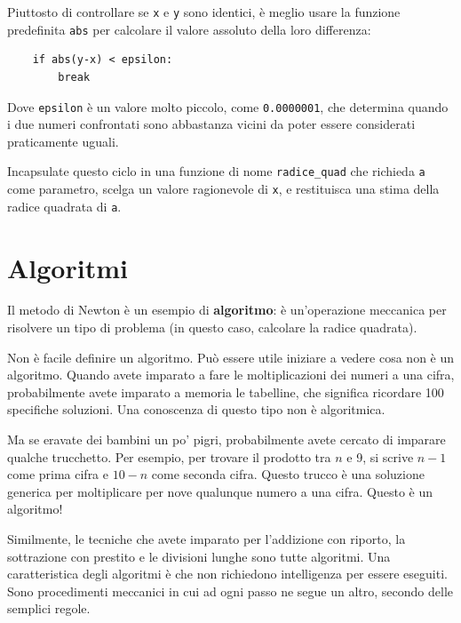 \documentclass[10pt]{book}
\begin{document}
Piuttosto di controllare se {\tt x} e {\tt y} sono identici, è meglio usare la funzione predefinita {\tt abs} per calcolare il valore assoluto della loro differenza:

\begin{verbatim}
    if abs(y-x) < epsilon:
        break
\end{verbatim}
%
Dove \verb"epsilon" è un valore molto piccolo, come {\tt 0.0000001}, che determina quando i due numeri confrontati sono abbastanza vicini da poter essere considerati praticamente uguali.

\vspace{0.2in}
\begin{exercise}

Incapsulate questo ciclo in una funzione di nome \verb"radice_quad"
che richieda {\tt a} come parametro, scelga un valore ragionevole di {\tt x}, e restituisca una stima della radice quadrata di {\tt a}.

\end{exercise}


\section{Algoritmi}

Il metodo di Newton è un esempio di {\bf algoritmo}: è un'operazione meccanica per risolvere un tipo di problema (in questo caso, calcolare la radice quadrata).

Non è facile definire un algoritmo. Può essere utile iniziare a vedere cosa non è un algoritmo. Quando avete imparato a fare le moltiplicazioni dei numeri a una cifra, probabilmente avete imparato a memoria le tabelline, che significa ricordare 100 specifiche soluzioni. Una conoscenza di questo tipo non è algoritmica.

Ma se eravate dei bambini un po' pigri, probabilmente avete cercato di imparare qualche trucchetto. Per esempio, per trovare il prodotto tra $n$ e 9, si scrive $n-1$ come prima cifra e $10-n$ come seconda cifra. Questo trucco è una soluzione generica per moltiplicare per nove qualunque numero a una cifra. Questo è un algoritmo!

Similmente, le tecniche che avete imparato per l'addizione con riporto, la sottrazione con prestito e le divisioni lunghe sono tutte algoritmi. Una caratteristica degli algoritmi è che non richiedono intelligenza per essere eseguiti. Sono procedimenti meccanici in cui ad ogni passo ne segue un altro, secondo delle semplici regole.
\end{document}
